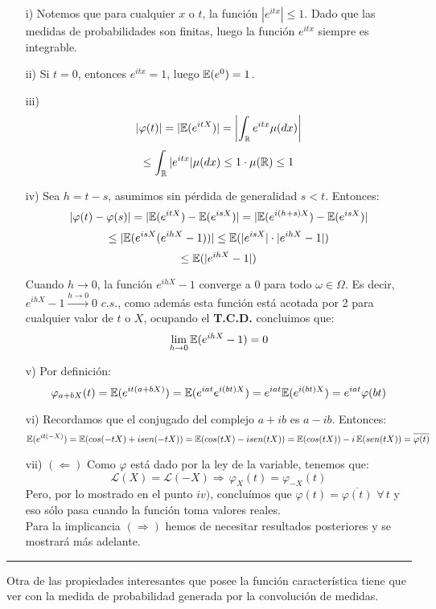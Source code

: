 \begin{itemize}
    \item[i)] Notemos que para cualquier $x$ o $t$, la función $|e^{itx}|\leq 1$. Dado que las medidas de probabilidades son finitas, luego la función $e^{itx}$ siempre es integrable.
    
    \item[ii)] Si $t=0$, entonces $e^{itx} = 1$, luego $\mathbb E(e^{0})= 1$.
    \item[iii)] 
    \[|\varphi(t)| = |\mathbb E(e^{itX})| = \left| \int_{\mathbb R}e^{itx}\mu(dx) \right|\]
    \[\leq \int_{\mathbb R}|e^{itx}| \mu(dx) \leq 1\cdot \mu(\mathbb R) \leq 1\]
    \item[iv)] Sea $h=t-s$, asumimos sin pérdida de generalidad $s<t$. Entonces:
    \[|\varphi(t) -\varphi(s)| = |\mathbb E(e^{itX})-\mathbb E(e^{isX})| = |\mathbb E(e^{i(h+s)X})-\mathbb E(e^{isX})|\]
    \[\leq |\mathbb E(e^{isX}(e^{ihX}-1))|\leq \mathbb E(|e^{isX}|\cdot |e^{ihX}-1|)\]
    \[\leq \mathbb E(|e^{ihX}-1|)\]
    
    Cuando $h\rightarrow 0$, la función $e^{ihX}-1$ converge a $0$ para todo $\omega \in \Omega$. Es decir, $e^{ihX}-1 \xrightarrow{h\rightarrow 0} 0$ $c.s.$, como además esta función está acotada por 2 para cualquier valor de $t$ o $X$, ocupando el \textbf{T.C.D.} concluimos que:
    \[\lim_{h\rightarrow 0}\mathbb E(e^{ihX}-1) = 0\]
    
    \item[v)] Por definición:
    \[\varphi_{a+bX}(t) = \mathbb E(e^{it(a+bX)}) = \mathbb E(e^{iat}e^{i(bt)X}) = e^{iat}\mathbb E(e^{i(bt)X}) = e^{iat}\varphi(bt)\]
    \item[vi)] Recordamos que el conjugado del complejo $a+ib$ es $a-ib$. Entonces:
    \[\mathbb E(e^{it(-X)})= \mathbb E(cos(-tX)+isen(-tX)) = \mathbb E(cos(tX)-isen(tX))= \mathbb E(cos(tX))-i\,\mathbb E(sen(tX)) = \overline{\varphi(t)}\]
\item[vii)] $(\Leftarrow)$ Como $\varphi$ está dado por la ley de la variable, tenemos que:
\[\mathcal{L}(X)=\mathcal{L}(-X) \Rightarrow\,\varphi_X(t) = \varphi_{-X}(t)\]
Pero, por lo mostrado en el punto $iv)$, concluímos que $\varphi(t) = \overline{\varphi(t)}$ $\forall\,t$ y eso sólo pasa cuando la función toma valores reales.\\ \newline
Para la implicancia $(\Rightarrow)$ hemos de necesitar resultados posteriores y se mostrará más adelante.
\end{itemize}
\rule{0.7em}{0.7em}

Otra de las propiedades interesantes que posee la función característica tiene que ver con la medida de probabilidad generada por la convolución de medidas.

